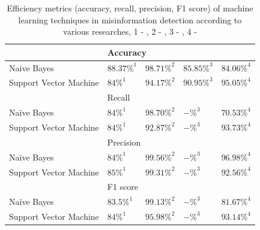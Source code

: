 \documentclass[11pt ,english,a4paper]{article}
\begin{document}
\begin{table}[H]
\centering
\begin{tabular}{lllll}
\cline{2-5}
                       & \multicolumn{4}{|l|}{Accuracy}  \\ [0.5ex]
\hline\hline
\multicolumn{1}{|l|}{Naive Bayes} & \multicolumn{1}{l|}{$88.37\%^{1}$} & \multicolumn{1}{l|}{$98.71\%^{2}$} & \multicolumn{1}{l|}{$85.85\%^{3}$} & \multicolumn{1}{l|}{ $84.06\%^{4}$}\\
\hline
\multicolumn{1}{|l|}{Support Vector Machine}& \multicolumn{1}{l|}{$84\%^{1}$} & \multicolumn{1}{l|}{$94.17\%^{2}$} & \multicolumn{1}{l|}{$90.95\%^{3}$} & \multicolumn{1}{l|}{$95.05\%^{4}$} \\ [1ex]
\hline\hline
\cline{2-5}
                       & \multicolumn{4}{|l|}{Recall}  \\ [0.5ex]
\hline\hline
\multicolumn{1}{|l|}{Naïve Bayes} & \multicolumn{1}{l|}{$84\%^{1}$} & \multicolumn{1}{l|}{$98.70\%^{2}$} & \multicolumn{1}{l|}{$-\%^{3}$} & \multicolumn{1}{l|}{ $70.53\%^{4}$}\\
\hline
\multicolumn{1}{|l|}{Support Vector Machine}& \multicolumn{1}{l|}{$84\%^{1}$} & \multicolumn{1}{l|}{$92.87\%^{2}$} & \multicolumn{1}{l|}{$-\%^{3}$} & \multicolumn{1}{l|}{$93.73\%^{4}$} \\ [1ex]
\hline\hline
\cline{2-5}
                       & \multicolumn{4}{|l|}{Precision}  \\ [0.5ex]
\hline\hline
\multicolumn{1}{|l|}{Naïve Bayes} & \multicolumn{1}{l|}{$84\%^{1}$} & \multicolumn{1}{l|}{$99.56\%^{2}$} & \multicolumn{1}{l|}{$-\%^{3}$} & \multicolumn{1}{l|}{ $96.98\%^{4}$}\\
\hline
\multicolumn{1}{|l|}{Support Vector Machine}& \multicolumn{1}{l|}{$85\%^{1}$} & \multicolumn{1}{l|}{$99.31\%^{2}$} & \multicolumn{1}{l|}{$-\%^{3}$} & \multicolumn{1}{l|}{$92.56\%^{4}$} \\ [1ex]
\hline\hline
\cline{2-5}
                       & \multicolumn{4}{|l|}{F1 score}  \\ [0.5ex]
\hline\hline
\multicolumn{1}{|l|}{Naïve Bayes} & \multicolumn{1}{l|}{$83.5\%^{1}$} & \multicolumn{1}{l|}{$99.13\%^{2}$} & \multicolumn{1}{l|}{$-\%^{3}$} & \multicolumn{1}{l|}{ $81.67\%^{4}$}\\
\hline
\multicolumn{1}{|l|}{Support Vector Machine}& \multicolumn{1}{l|}{$84\%^{1}$} & \multicolumn{1}{l|}{$95.98\%^{2}$} & \multicolumn{1}{l|}{$-\%^{3}$} & \multicolumn{1}{l|}{$93.14\%^{4}$} \\ [1ex]
\hline\hline
\end{tabular}
\caption{\centering Efficiency metrics (accuracy, recall, precision, F1 score) of machine learning techniques in misinformation detection according to various researches, 1 - \cite{chap22unmask}, 2 - \cite{bar21health}, 3 - \cite{pod19mach}, 4 - \cite{sha20mach}}
\label{table:results}
\end{table}
\end{document}

